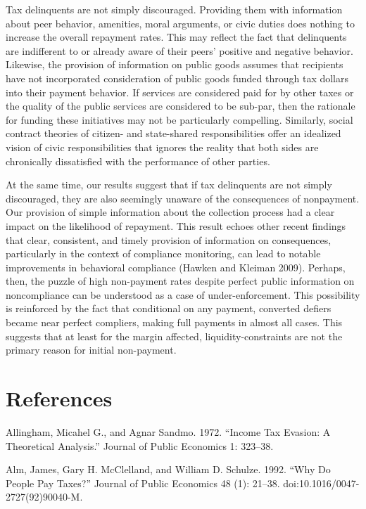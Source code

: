 \documentclass[12pt,titlepage]{article}
\begin{document}
Tax delinquents are not simply discouraged. Providing them with 
information about peer behavior, amenities, moral arguments, or civic 
duties does nothing to increase the overall repayment rates. This may 
reflect the fact that delinquents are indifferent to or already aware 
of their peers’ positive and negative behavior. Likewise, the provision 
of information on public goods assumes that recipients have not 
incorporated consideration of public goods funded through tax dollars 
into their payment behavior. If services are considered paid for by 
other taxes or the quality of the public services are considered to be 
sub-par, then the rationale for funding these initiatives may not be 
particularly compelling.  Similarly, social contract theories of citizen- 
and state-shared responsibilities offer an idealized vision of civic 
responsibilities that ignores the reality that both sides are chronically 
dissatisfied with the performance of other parties.

At the same time, our results suggest that if tax delinquents are not 
simply discouraged, they are also seemingly unaware of the consequences 
of nonpayment. Our provision of simple information about the collection 
process had a clear impact on the likelihood of repayment. This result 
echoes other recent findings that clear, consistent, and timely provision 
of information on consequences, particularly in the context of compliance 
monitoring, can lead to notable improvements in behavioral compliance 
(Hawken and Kleiman 2009). Perhaps, then, the puzzle of high non-payment 
rates despite perfect public information on noncompliance can be understood 
as a case of under-enforcement. This possibility is reinforced by the fact 
that conditional on any payment, converted defiers became near perfect 
compliers, making full payments in almost all cases. This suggests that at 
least for the margin affected, liquidity-constraints are not the primary 
reason for initial non-payment.

\section{References}
Allingham, Micahel G., and Agnar Sandmo. 1972. “Income Tax Evasion: A Theoretical Analysis.” Journal of Public Economics 1: 323–38.

Alm, James, Gary H. McClelland, and William D. Schulze. 1992. “Why Do People Pay Taxes?” Journal of Public Economics 48 (1): 21–38. doi:10.1016/0047-2727(92)90040-M.
\end{document}
